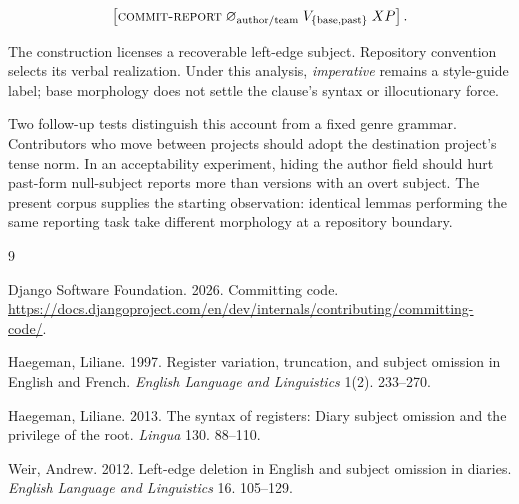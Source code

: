 \documentclass[12pt]{article}
\begin{document}
\[
\left[\textsc{commit-report}\;\varnothing_{\mathrm{author/team}}\;
V_{\{\mathrm{base},\mathrm{past}\}}\;XP\right].
\]

The construction licenses a recoverable left-edge subject. Repository convention
selects its verbal realization. Under this analysis, \emph{imperative} remains
a style-guide label; base morphology does not settle the clause's syntax or
illocutionary force.

Two follow-up tests distinguish this account from a fixed genre grammar.
Contributors who move between projects should adopt the destination project's
tense norm. In an acceptability experiment, hiding the author field should hurt
past-form null-subject reports more than versions with an overt subject. The
present corpus supplies the starting observation: identical lemmas performing
the same reporting task take different morphology at a repository boundary.

\vspace{-0.35em}
\begin{thebibliography}{9}
\setlength{\itemsep}{0pt}
\setlength{\parskip}{0pt}

Django Software Foundation. 2026.
\newblock Committing code.
\newblock \url{https://docs.djangoproject.com/en/dev/internals/contributing/committing-code/}.

Haegeman, Liliane. 1997.
\newblock Register variation, truncation, and subject omission in English and French.
\newblock \textit{English Language and Linguistics} 1(2). 233--270.

Haegeman, Liliane. 2013.
\newblock The syntax of registers: Diary subject omission and the privilege of the root.
\newblock \textit{Lingua} 130. 88--110.

Weir, Andrew. 2012.
\newblock Left-edge deletion in English and subject omission in diaries.
\newblock \textit{English Language and Linguistics} 16. 105--129.

\end{thebibliography}
\end{document}
